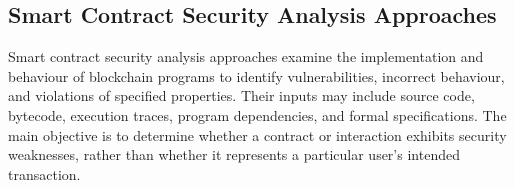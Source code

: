 








\subsection{Smart Contract Security Analysis Approaches}
\label{subsec:smart_contract_security}

Smart contract security analysis approaches examine the
implementation and behaviour of blockchain programs to
identify vulnerabilities, incorrect behaviour, and violations
of specified properties. Their inputs may include source code,
bytecode, execution traces, program dependencies, and formal
specifications. The main objective is to determine whether
a contract or interaction exhibits security weaknesses,
rather than whether it represents a particular user's
intended transaction. 

